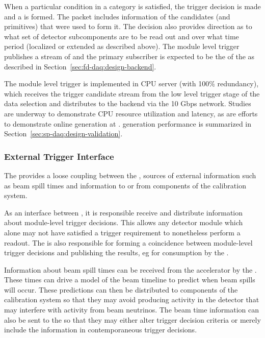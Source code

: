 When a particular condition in a category is satisfied, the trigger
decision is made and a  is formed. 
The  packet includes information of the candidates (and primitives)
that were used to form it. 
The decision also provides direction as to what set of detector subcomponents
are to be read out and over what time period (localized or extended as described above). 
The module level trigger publishes a stream of  and the primary subscriber is expected to be the  of the  as described in Section~\ref{sec:fd-daq:design-backend}.

The module level trigger is implemented in  CPU server (with 100\%
redundancy), which
receives the trigger candidate stream from the low level trigger stage
of the data selection and distributes  to the
backend  via the 10 Gbps  network. Studies are
underway to demonstrate CPU resource utilization and latency, as are
efforts to demonstrate online  generation at .
 generation performance is summarized in
Section~\ref{sec:sp-daq:design-validation}.

\subsubsection{External Trigger Interface}

The  provides a loose coupling between the , sources of external information such as beam spill times and information to or from components of the calibration system. 

As an interface between , it is responsible receive and distribute information about module-level  trigger decisions.
This allows any detector module which alone may not have satisfied a  trigger requirement to nonetheless perform a  readout.
The  is also responsible for forming a coincidence between module-level  trigger decisions and publishing the results, eg for consumption by the .

Information about beam spill times can be received from the accelerator by the . 
These times can drive a model of the beam timeline to predict when beam spills will occur. 
These predictions can then be distributed to components of the calibration system so that they may avoid producing activity in the detector that may interfere with activity from beam neutrinos.
The beam time information can also be sent to the  so that they may either alter trigger decision criteria or merely include the information in contemporaneous trigger decisions.




